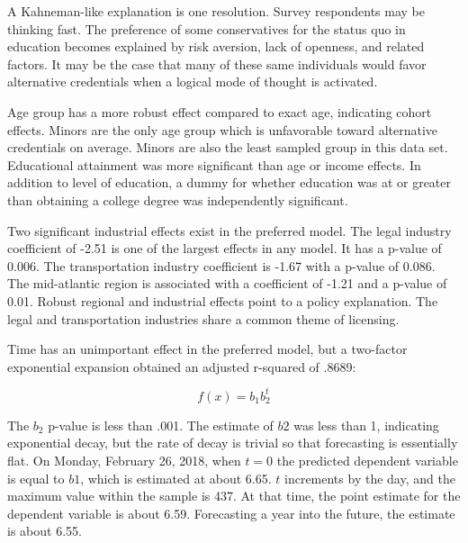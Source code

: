 \documentclass[review]{elsarticle}
\begin{document}
        A Kahneman-like explanation is one resolution.
        Survey respondents may be thinking fast\cite{kahneman2011thinking}.
        The preference of some conservatives for the status quo in education becomes explained by
        risk aversion, lack of openness, and related factors.
        It may be the case that many of these same individuals would favor alternative
        credentials when a logical mode of thought is activated.
        
        Age group has a more robust effect compared to exact age, indicating cohort effects.
        Minors are the only age group which is unfavorable toward alternative credentials on average.
        Minors are also the least sampled group in this data set.
        Educational attainment was more significant than age or income effects.
        In addition to level of education, a dummy for whether education was at or greater than
        obtaining a college degree was independently significant.
        
        Two significant industrial effects exist in the preferred model.
        The legal industry coefficient of -2.51 is one of the largest effects in any model.
        It has a p-value of 0.006.
        The transportation industry coefficient is -1.67 with a p-value of 0.086.
        The mid-atlantic region is associated with a coefficient of -1.21 and a p-value of 0.01.
        Robust regional and industrial effects point to a policy explanation.
        The legal and transportation industries share a common theme of licensing.
        
        Time has an unimportant effect in the preferred model,
        but a two-factor exponential expansion obtained an adjusted r-squared of .8689:
        
        \begin{equation} f(x) = b_1b_2^t \end{equation}
        
        The $b_2$ p-value is less than .001. The estimate of $b2$ was less than 1, indicating exponential
        decay, but the rate of decay is trivial so that forecasting is essentially flat.
        On Monday, February 26, 2018, when $t=0$ the predicted dependent variable is equal to $b1$, which is estimated at about 6.65.
        $t$ increments by the day, and the maximum value within the sample is 437. At that time, the point estimate
        for the dependent variable is about 6.59. Forecasting a year into the future, the estimate is about 6.55.
        
\end{document}
